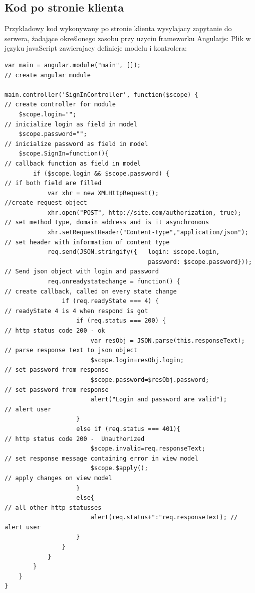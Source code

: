 \documentclass[12pt]{report}
\begin{document}
\subsection{Kod po stronie klienta}
Przykladowy kod wykonywany po stronie klienta wysylajacy zapytanie do serwera, żadające określonego zasobu przy uzyciu frameworku Angularjs:
Plik w języku javaScript zawierajacy definicje modelu i kontrolera:
\medskip
\begin{lstlisting}
var main = angular.module("main", []); 									// create angular module

main.controller('SignInController', function($scope) { 					// create controller for module
	$scope.login=""; 													// inicialize login as field in model
	$scope.password=""; 												// inicialize password as field in model
	$scope.SignIn=function(){ 											// callback function as field in model
		if ($scope.login && $scope.password) {							// if both field are filled
			var xhr = new XMLHttpRequest();									//create request object
			xhr.open("POST", http://site.com/authorization, true);		// set method type, domain address and is it asynchronous
			xhr.setRequestHeader("Content-type","application/json");	// set header with information of content type
			req.send(JSON.stringify({	login: $scope.login,			
										password: $scope.password})); 	// Send json object with login and password
			req.onreadystatechange = function() { 						// create callback, called on every state change
				if (req.readyState === 4) { 							// readyState 4 is 4 when respond is got
					if (req.status === 200) { 							// http status code 200 - ok
						var resObj = JSON.parse(this.responseText);		// parse response text to json object
						$scope.login=resObj.login;						// set password from response
						$scope.password=$resObj.password;				// set password from response
						alert("Login and password are valid");			// alert user
					}
					else if (req.status === 401){						// http status code 200 -  Unauthorized
						$scope.invalid=req.responseText;  				// set response message containing error in view model
						$scope.$apply(); 								// apply changes on view model
					}
					else{ 												// all other http statusses
						alert(req.status+":"req.responseText); // alert user
					}
				}
			}
		}
	}
}
\end{lstlisting}
\end{document}
